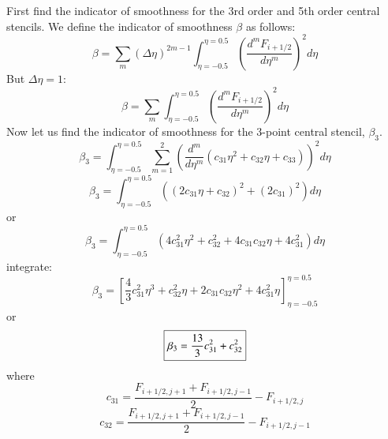 \documentclass{warpdoc}
\newcommand\frameeqn[1]{\fbox{$\displaystyle #1$}}
\begin{document}
First find the indicator of smoothness for the 3rd order and 5th order central stencils. We define the indicator of smoothness $\beta$  as follows:
%
\begin{equation}
\beta = \sum_m (\Delta \eta)^{2m-1} \int_{\eta=-0.5}^{\eta=0.5} \left( \frac{d^m F_{i+1/2}}{d\eta^m} \right)^2 d\eta
\end{equation}
%
But $\Delta \eta=1$:
%
\begin{equation}
\beta = \sum_m  \int_{\eta=-0.5}^{\eta=0.5} \left( \frac{d^m F_{i+1/2}}{d\eta^m} \right)^2 d\eta
\end{equation}
%
Now let us find the indicator of smoothness for the 3-point central stencil, $\beta_3$. 
%
\begin{equation}
\beta_3 =   \int_{\eta=-0.5}^{\eta=0.5} \sum_{m=1}^2 \left(  \frac{d^m }{d\eta^m}\left(c_{31} \eta^2 + c_{32} \eta + c_{33} 
\right) \right)^2 d\eta
\end{equation}
%
%
\begin{equation}
\beta_3 =   \int_{\eta=-0.5}^{\eta=0.5}  \left(\left(  2 c_{31} \eta + c_{32}  
\right)^2 +  \left(  2 c_{31}   
\right)^2 \right) d\eta
\end{equation}
%
or
%
\begin{equation}
\beta_3 =   \int_{\eta=-0.5}^{\eta=0.5}  \left(  4 c_{31}^2 \eta^2 + c_{32}^2 + 4 c_{31} c_{32} \eta  +   4 c_{31}^2   
 \right) d\eta
\end{equation}
%
integrate:
%
\begin{equation}
\beta_3 =     \left[  \frac{4}{3} c_{31}^2 \eta^3 + c_{32}^2 \eta + 2 c_{31} c_{32} \eta^2  +   4 c_{31}^2 \eta   
 \right]_{\eta=-0.5}^{\eta=0.5}
\end{equation}
%
or
%
\begin{equation}
\frameeqn{
\beta_3 =     \frac{13}{3} c_{31}^2  + c_{32}^2     
}
\end{equation}
%
where
%
\begin{equation}
c_{31}=\frac{F_{i+1/2,j+1}+F_{i+1/2,j-1}}{2}- F_{i+1/2,j} 
\end{equation}
% 
%
\begin{equation}
c_{32}=\frac{F_{i+1/2,j+1}+F_{i+1/2,j-1}}{2} -F_{i+1/2,j-1}
\end{equation}
% 
\end{document}

